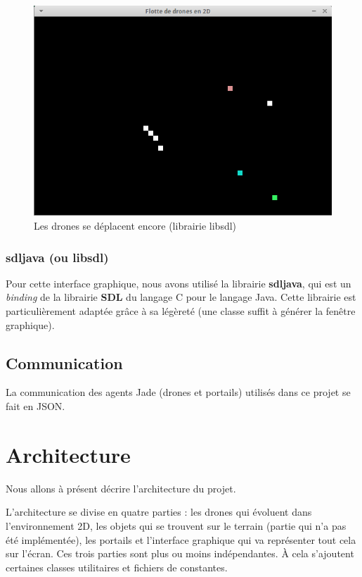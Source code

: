 \documentclass[11pt]{report}
\begin{document}
\begin{figure}
\centering
\includegraphics[scale = 0.9]{img/flotte-4.png}
\caption{Les drones se déplacent encore (librairie libsdl)}
\end{figure}

\clearpage

\subsubsection{sdljava (ou libsdl)}

Pour cette interface graphique, nous avons utilisé la librairie \textbf{sdljava}, qui est un \textit{binding} de la librairie \textbf{SDL} du langage C pour le langage Java. Cette librairie est particulièrement adaptée grâce à sa légèreté (une classe suffit à générer la fenêtre graphique).

\subsection{Communication}

La communication des agents Jade (drones et portails) utilisés dans ce projet se fait en JSON.

\section{Architecture}

Nous allons à présent décrire l'architecture du projet.

L'architecture se divise en quatre parties : les drones qui évoluent dans l'environnement 2D, les objets qui se trouvent sur le terrain (partie qui n'a pas été implémentée), les portails et l'interface graphique qui va représenter tout cela sur l'écran. Ces trois parties sont plus ou moins indépendantes. À cela s'ajoutent certaines classes utilitaires et fichiers de constantes. 
\end{document}
